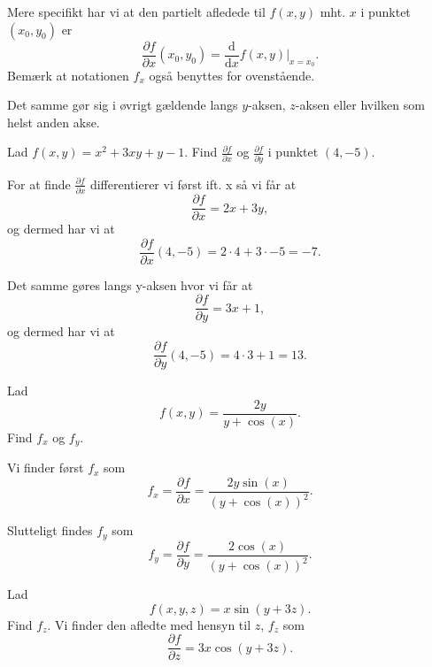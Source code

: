 \begin{definition}
  Mere specifikt har vi at den partielt afledede til $f(x, y)$ mht. $x$ i punktet $(x_0, y_0)$ er
  \[ 
  \frac{\partial f}{\partial x}(x_0, y_0) = \frac{\mathrm{d}}{\mathrm{d}x} f(x, y) |_{x = x_0}
  .\]
  Bemærk at notationen $f_x$ også benyttes for ovenstående.

  Det samme gør sig i øvrigt gældende langs $y$-aksen, $z$-aksen eller hvilken som helst anden akse.
\end{definition}

\begin{eks}
  Lad $f(x,y) = x^2 + 3xy + y -1$. Find $\frac{\partial f}{\partial x}$ og $\frac{\partial f}{\partial y}$ i punktet $(4,-5)$. 
  
  For at finde $\frac{\partial f}{\partial x}$ differentierer vi først ift. x så vi får at
  \[ 
  \frac{\partial f}{\partial x} = 2x + 3y
  ,\]
  og dermed har vi at
  \[ 
  \frac{\partial f}{\partial x}(4, -5) = 2\cdot4 + 3\cdot-5 = -7
  .\]
  
  Det samme gøres langs y-aksen hvor vi får at
  \[ 
  \frac{\partial f}{\partial y} = 3x+1
  ,\]
  og dermed har vi at
  \[ 
  \frac{\partial f}{\partial y}(4,-5) = 4\cdot3 + 1 = 13
  .\]
\end{eks}

\begin{eks}
  Lad 
  \[ 
  f(x,y) = \frac{2y}{y + \cos(x)}
  .\]
  Find $f_x$ og $f_y$.

  Vi finder først $f_x$ som
  \[ 
  f_x = \frac{\partial f}{\partial x} = \frac{2y \sin(x)}{(y + \cos(x))^2}
  .\]
  
  Slutteligt findes $f_y$ som
  \[ 
  f_y = \frac{\partial f}{\partial y} = \frac{2 \cos(x)}{(y + \cos(x))^2}
  .\]
\end{eks}

\begin{eks}
  Lad
  \[ 
  f(x,y,z) = x \sin(y+3z)
  .\]
  Find $f_z$.
  Vi finder den afledte med hensyn til $z$, $f_z$ som
  \[ 
  \frac{\partial f}{\partial z} = 3x \cos(y + 3z)
  .\]
\end{eks}


